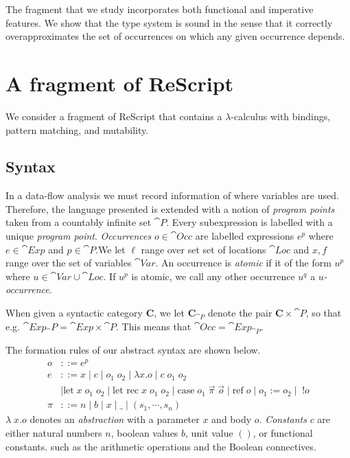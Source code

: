 \documentclass{llncs}
\newcommand{\refc}{\ensuremath{\textrm{ref}\xspace}}
\begin{document}
The fragment that we study incorporates both functional and imperative
features. We show that the type system is sound in the sense that
it correctly overapproximates the set of occurrences on which any
given occurrence depends.

\section{A fragment of ReScript}\label{sec:lang}

We consider a fragment of ReScript that contains a $\lambda$-calculus
with bindings, pattern matching, and mutability.
 
\subsection{Syntax}

In a data-flow analysis we must record information of where variables
are used.  Therefore, the language presented is extended with a notion
of \emph{program points} taken from a countably infinite set
$\cat{P}$.
%
Every subexpression is labelled with a unique \emph{program
  point}. \emph{Occurrences} $o \in \cat{Occ}$ are labelled
expressions $e^p$ where $e \in \cat{Exp}$ and $p \in \cat{P}$.We let
$\ell$ range over set set of locations $\cat{Loc}$ and $x,f$ range
over the set of variables $\cat{Var}$.  An occurrence is \emph{atomic}
if it of the form $u^p$ where $u \in \cat{Var} \cup \cat{Loc}$. If
$u^p$ is atomic, we call any other occurrence $u^q$ a
\emph{$u$-occurrence}.

When given a syntactic category $\mathbf{C}$, we let
$\mathbf{C}_{\cat{P}}$ denote the pair $\mathbf{C}\times\cat{P}$, so
that e.g.  $\cat{Exp}_\cat{P}=\cat{Exp}\times\cat{P}$.  This means
that $\cat{Occ}=\cat{Exp}_{\cat{P}}$.

The formation rules of our abstract syntax are shown below.
%
\begin{align*}
o &::= e^p \\
e &::= x \mid c \mid o_1\;o_2 \mid \lambda x.o \mid c \; o_1 \; o_2\\
			& \mid \mbox{let} \; x \; o_1 \; o_2 \mid
                   \mbox{let rec} \; x \; o_1 \; o_2 \mid \mbox{case}
                   \; o_1 \; \vec{\pi} \; \vec{o} \mid  \refc \; o \mid o_1 := o_2 \mid \; !o\\
\pi &::= n \mid b \mid x \mid \_  \mid
                                (s_1,\cdots,s_n)
\end{align*}
%
$\lambda\;x.o$ denotes an \emph{abstraction} with a parameter $x$ and
body $o$.  \emph{Constants} $c$ are either natural numbers $n$,
boolean values $b$, unit value $()$, or functional constants.  such as
the arithmetic operations and the Boolean connectives.
\end{document}
